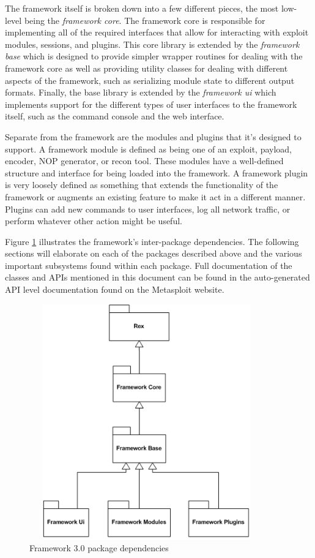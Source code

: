\documentclass{report}
\begin{document}
\par
The framework itself is broken down into a few different pieces, the
most low-level being the \textit{framework core}.  The framework
core is responsible for implementing all of the required interfaces
that allow for interacting with exploit modules, sessions, and
plugins. This core library is extended by the \textit{framework
base} which is designed to provide simpler wrapper routines for
dealing with the framework core as well as providing utility classes
for dealing with different aspects of the framework, such as
serializing module state to different output formats.  Finally, the
base library is extended by the \textit{framework ui} which
implements support for the different types of user interfaces to the
framework itself, such as the command console and the web interface.

\par
Separate from the framework are the modules and plugins that it's
designed to support.  A framework module is defined as being one of
an exploit, payload, encoder, NOP generator, or recon tool. These
modules have a well-defined structure and interface for being loaded
into the framework.  A framework plugin is very loosely defined as
something that extends the functionality of the framework or
augments an existing feature to make it act in a different manner.
Plugins can add new commands to user interfaces, log all network
traffic, or perform whatever other action might be useful.

\par
Figure \ref{fig-arch-pkg} illustrates the framework's inter-package
dependencies.  The following sections will elaborate on each of the
packages described above and the various important subsystems found
within each package.  Full documentation of the classes and APIs
mentioned in this document can be found in the auto-generated API
level documentation found on the Metasploit website.

\begin{figure}[h]
\begin{center}
\includegraphics[height=4in,width=4in]{dev_guide_arch_packages}
\caption{Framework 3.0 package dependencies} \label{fig-arch-pkg}
\end{center}
\end{figure}
\end{document}
